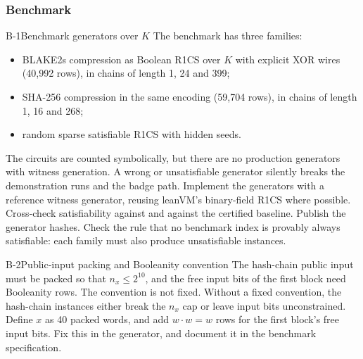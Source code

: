 \subsubsection{Benchmark}

\begin{issue}{B-1}{Benchmark generators over \texorpdfstring{$K$}{K}}
\IRprob The benchmark has three families:
\begin{itemize}[nosep]
\item BLAKE2s compression as Boolean R1CS over $K$ with explicit XOR wires (40,992 rows), in
  chains of length 1, 24 and 399;
\item SHA-256 compression in the same encoding (59,704 rows), in chains of length 1, 16 and 268;
\item random sparse satisfiable R1CS with hidden seeds.
\end{itemize}
The circuits are counted symbolically, but there are no production generators with witness
generation.
\IRwhy A wrong or unsatisfiable generator silently breaks the demonstration runs and the badge
path.
\IRres Implement the generators with a reference witness generator, reusing leanVM's binary-field
R1CS where possible. Cross-check satisfiability against  and against the
certified baseline. Publish the generator hashes. Check the rule that no benchmark index is
provably always satisfiable: each family must also produce unsatisfiable instances.
\end{issue}

\begin{issue}{B-2}{Public-input packing and Booleanity convention}
\IRprob The hash-chain public input must be packed so that $n_x\le2^{10}$, and the free input bits
of the first block need Booleanity rows. The convention is not fixed.
\IRwhy Without a fixed convention, the hash-chain instances either break the $n_x$ cap or leave
input bits unconstrained.
\IRres Define $x$ as 40 packed words, and add $w\cdot w=w$ rows for the first block's free input
bits. Fix this in the generator, and document it in the benchmark specification.
\end{issue}

